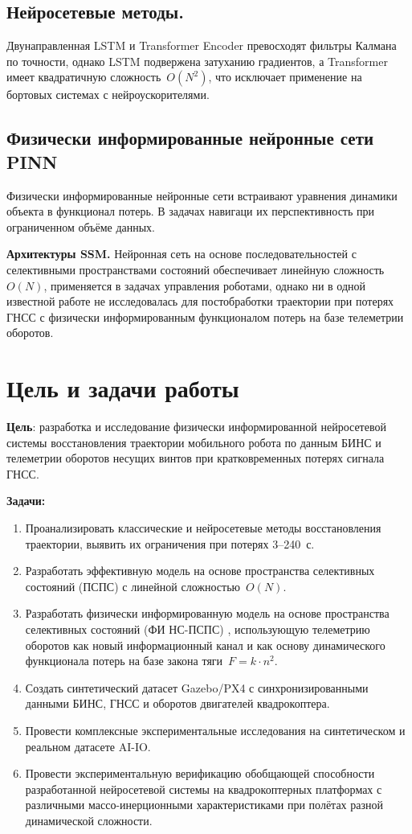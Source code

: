 \subsection{Нейросетевые методы.} 
Двунаправленная LSTM \cite{Guang2021} и Transformer Encoder \cite{Guyard2025} превосходят
фильтры Калмана по точности, однако LSTM подвержена затуханию градиентов, а Transformer
имеет квадратичную сложность~$O(N^2)$, что исключает применение на бортовых системах с
нейроускорителями\cite{Chen2024}.

\subsection{Физически информированные нейронные сети PINN}
Физически информированные нейронные сети \cite{raissi2019physics}
встраивают уравнения динамики объекта в функционал потерь.
В задачах навигаци их перспективность при ограниченном объёме данных. 

\textbf{Архитектуры SSM.} Нейронная сеть на основе последовательностей с
селективными пространствами состояний \cite{mamba_ssm}
обеспечивает линейную сложность~$O(N)$, применяется в задачах управления роботами, однако
ни в одной известной работе не исследовалась для постобработки траектории при потерях ГНСС
с физически информированным функционалом потерь на базе телеметрии оборотов.

\section{Цель и задачи работы}

\textbf{Цель}: разработка и исследование физически информированной нейросетевой системы
восстановления траектории мобильного робота по данным БИНС и телеметрии оборотов несущих
винтов при кратковременных потерях сигнала ГНСС.

\textbf{Задачи:}
\begin{enumerate}
	\item Проанализировать классические и нейросетевые методы восстановления траектории,
	выявить их ограничения при потерях 3--240~с.
	\item Разработать эффективную модель на основе пространства селективных состояний (ПСПС) с линейной сложностью~$O(N)$.
	\item Разработать физически информированную модель на основе пространства селективных состояний (ФИ НС-ПСПС) , использующую
	телеметрию оборотов как новый информационный канал и как основу динамического
	функционала потерь на базе закона тяги~$F{=}k{\cdot}n^2$.
	\item Создать синтетический датасет Gazebo/PX4 с синхронизированными данными БИНС,
	ГНСС и оборотов двигателей квадрокоптера.
	\item Провести комплексные экспериментальные исследования на синтетическом
	и реальном датасете AI-IO.
	\item Провести экспериментальную верификацию обобщающей способности разработанной нейросетевой системы на 
	квадрокоптерных платформах с различными массо-инерционными характеристиками при полётах разной динамической сложности.
\end{enumerate}

